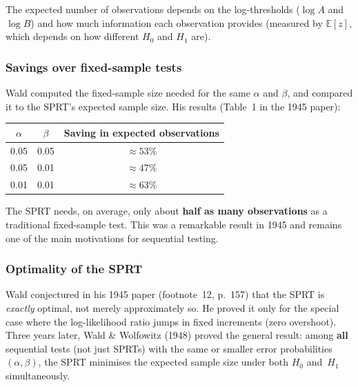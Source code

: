 \documentclass[12pt, a4paper]{article}
\newcommand{\E}{\mathbb{E}}            %
\begin{document}
\begin{plainlanguage}
The expected number of observations depends on the log-thresholds ($\log A$
and $\log B$) and how much information each observation provides (measured by
$\E[z]$, which depends on how different $H_0$ and $H_1$ are).
\end{plainlanguage}

\subsubsection*{Savings over fixed-sample tests}

Wald computed the fixed-sample size needed for the same $\alpha$ and $\beta$,
and compared it to the SPRT's expected sample size.  His results (Table~1 in
the 1945 paper):

\begin{center}
\begin{tabular}{@{} c c c @{}}
\toprule
$\alpha$ & $\beta$ & \textbf{Saving in expected observations} \\
\midrule
0.05 & 0.05 & $\approx 53\%$ \\
0.05 & 0.01 & $\approx 47\%$ \\
0.01 & 0.01 & $\approx 63\%$ \\
\bottomrule
\end{tabular}
\end{center}

\begin{plainlanguage}
The SPRT needs, on average, only about \textbf{half as many observations} as a
traditional fixed-sample test.  This was a remarkable result in 1945 and
remains one of the main motivations for sequential testing.
\end{plainlanguage}

\subsubsection*{Optimality of the SPRT}

\begin{historynote}
Wald conjectured in his 1945 paper (footnote~12, p.~157) that the SPRT is
\emph{exactly} optimal, not merely approximately so.  He proved it only for
the special case where the log-likelihood ratio jumps in fixed increments
(zero overshoot).  Three years later, Wald \& Wolfowitz
(1948) proved the general result: among \textbf{all} sequential tests
(not just SPRTs) with the same or smaller error probabilities $(\alpha, \beta)$,
the SPRT minimises the expected sample size under both $H_0$ and~$H_1$
simultaneously.
\end{historynote}
\end{document}
